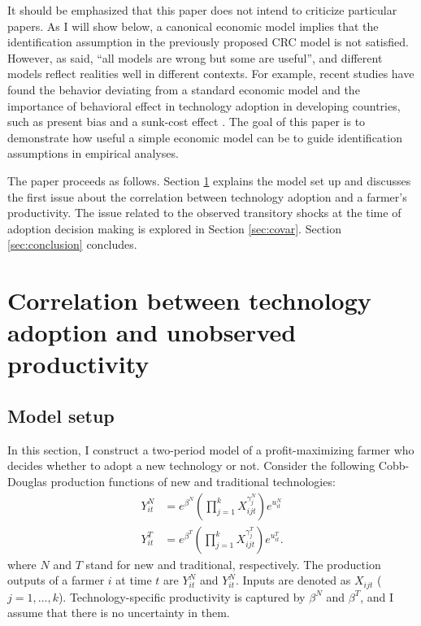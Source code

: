 \documentclass[11pt,letterpaper]{article}
\begin{document}
It should be emphasized that this paper does not intend to criticize particular papers.
As I will show below, a canonical economic model implies that the identification assumption in the previously proposed CRC model is not satisfied.
However, as said, ``all models are wrong but some are useful'', and different models reflect realities well in different contexts.
For example, recent studies have found the behavior deviating from a standard economic model and the importance of behavioral effect in technology adoption in developing countries, such as present bias \citep{duflo2011nudging} and a sunk-cost effect \citep{ashraf2010can}.
The goal of this paper is to demonstrate how useful a simple economic model can be to guide identification assumptions in empirical analyses.

The paper proceeds as follows.
Section \ref{sec:tau} explains the model set up and discusses the first issue about the correlation between technology adoption and a farmer's productivity.
The issue related to the observed transitory shocks at the time of adoption decision making is explored in Section \ref{sec:covar}.
Section \ref{sec:conclusion} concludes.

\section{Correlation between technology adoption and unobserved productivity}\label{sec:tau}
\subsection{Model setup}

In this section, I construct a two-period model of a profit-maximizing farmer who decides whether to adopt a new technology or not.
Consider the following Cobb-Douglas production functions of new and traditional technologies:
\begin{align*}
  Y_{it}^N &= e^{\beta^N} \left(\prod_{j=1}^k X_{ijt}^{\gamma_j^N} \right) e^{u_{it}^N} \\
  Y_{it}^T &= e^{\beta^T} \left(\prod_{j=1}^k X_{ijt}^{\gamma_j^T} \right) e^{u_{it}^T}.
\end{align*}
where $N$ and $T$ stand for new and traditional, respectively.
The production outputs of a farmer $i$ at time $t$ are $Y_{it}^N$ and $Y_{it}^N$.
Inputs are denoted as $X_{ijt}$ ($j = 1, \dots, k$).
Technology-specific productivity is captured by $\beta^N$ and $\beta^T$, and I assume that there is no uncertainty in them.
\end{document}
